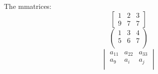 \documentclass[a4paper,10pt]{article}
\begin{document}
The mmatrices:
\begin{equation}
\begin{bmatrix}
1 & 2 & 3 \\
9& 7 & 7
\end{bmatrix}
\end{equation}
\begin{equation}
\begin{pmatrix}
1 & 3 & 4 \\
5 & 6 & 7 \\
\end{pmatrix}
\end{equation}
\begin{equation}
\begin{vmatrix}
a_{11} & a_{22} & a_{33} \\
a_9 & a_i & a_j \\
\end{vmatrix}
\end{equation}
\end{document}
